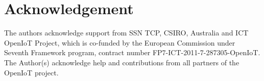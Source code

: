 \documentclass[times]{ettauth}
\begin{document}
\section*{Acknowledgement}

The authors acknowledge support from SSN TCP, CSIRO, Australia and ICT OpenIoT Project, which is co-funded by the European Commission under Seventh Framework program, contract number FP7-ICT-2011-7-287305-OpenIoT. The Author(s) acknowledge help and contributions from all partners of the OpenIoT project.






\end{document}
